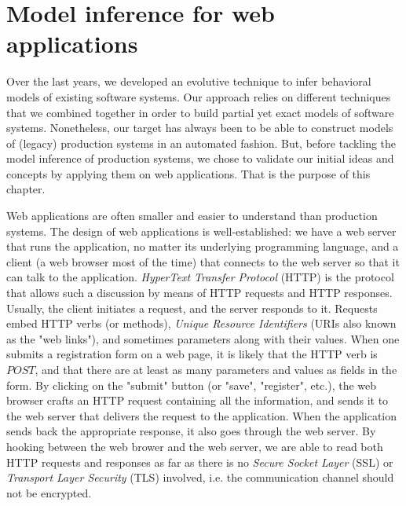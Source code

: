 %
\chapter{Model inference for web applications}
\label{sec:modelinf:webapps}

Over the last years, we developed an evolutive technique to infer
behavioral models of existing software systems. Our approach
relies on different techniques that we combined together in order
to build partial yet exact models of software systems.
Nonetheless, our target has always been to be able to construct
models of (legacy) production systems in an automated fashion.
But, before tackling the model inference of production systems,
we chose to validate our initial ideas and concepts by applying
them on web applications. That is the purpose of this chapter.

Web applications are often smaller and easier to understand than
production systems. The design of web applications is
well-established: we have a web server that runs the application,
no matter its underlying programming language, and a client (a
web browser most of the time) that connects to the web server so
that it can talk to the application. \textit{HyperText Transfer
Protocol} (HTTP) is the protocol that allows such a discussion by
means of HTTP requests and HTTP responses. Usually, the client
initiates a request, and the server responds to it. Requests
embed HTTP verbs (or methods), \textit{Unique Resource
Identifiers} (URIs also known as the "web links"), and sometimes
parameters along with their values. When one submits a
registration form on a web page, it is likely that the HTTP verb
is $POST$, and that there are at least as many parameters and
values as fields in the form. By clicking on the "submit" button
(or "save", "register", etc.), the web browser crafts an HTTP
request containing all the information, and sends it to the web
server that delivers the request to the application. When the
application sends back the appropriate response, it also goes
through the web server. By hooking between the web brower and the
web server, we are able to read both HTTP requests and responses
as far as there is no \textit{Secure Socket Layer} (SSL) or
\textit{Transport Layer Security} (TLS) involved, i.e. the
communication channel should not be encrypted.


